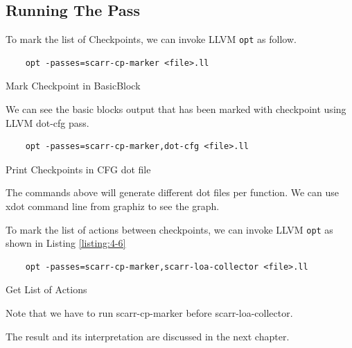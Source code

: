 \subsection{Running The Pass}

To mark the list of Checkpoints, we can invoke LLVM \texttt{opt} as follow.

\begin{listing}
\begin{verbatim}
    opt -passes=scarr-cp-marker <file>.ll
\end{verbatim}
\caption{Mark Checkpoint in BasicBlock}    
\label{listing:4-4}
\end{listing}

We can see the basic blocks output that has been marked with checkpoint using LLVM dot-cfg pass.

\begin{listing}
\begin{verbatim}
    opt -passes=scarr-cp-marker,dot-cfg <file>.ll
\end{verbatim}
\caption{Print Checkpoints in CFG dot file}    
\label{listing:4-5}
\end{listing}

The commands above will generate different dot files per function. We can use xdot command line from graphiz to see the graph. 

To mark the list of actions between checkpoints, we can invoke LLVM \texttt{opt} as shown in Listing \ref{listing:4-6}

\begin{listing}
\begin{verbatim}
    opt -passes=scarr-cp-marker,scarr-loa-collector <file>.ll
\end{verbatim}
\caption{Get List of Actions}    
\label{listing:4-6}
\end{listing}

Note that we have to run scarr-cp-marker before scarr-loa-collector.

The result and its interpretation are discussed in the next chapter.